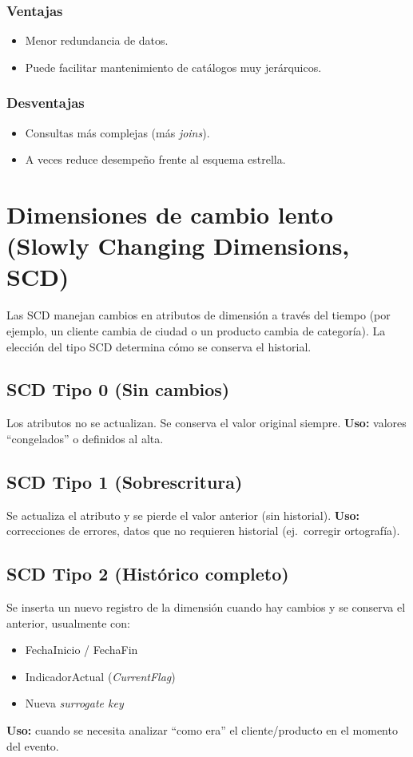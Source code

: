 \documentclass[12pt]{article}
\begin{document}
\subsubsection*{Ventajas}
\begin{itemize}[leftmargin=*, itemsep=0.25em]
  \item Menor redundancia de datos.
  \item Puede facilitar mantenimiento de catálogos muy jerárquicos.
\end{itemize}

\subsubsection*{Desventajas}
\begin{itemize}[leftmargin=*, itemsep=0.25em]
  \item Consultas más complejas (más \textit{joins}).
  \item A veces reduce desempeño frente al esquema estrella.
\end{itemize}

\section{Dimensiones de cambio lento (Slowly Changing Dimensions, SCD)}
Las SCD manejan cambios en atributos de dimensión a través del tiempo (por ejemplo, un cliente cambia de ciudad o un producto cambia de categoría). La elección del tipo SCD determina cómo se conserva el historial.

\subsection*{SCD Tipo 0 (Sin cambios)}
Los atributos no se actualizan. Se conserva el valor original siempre. \textbf{Uso:} valores ``congelados'' o definidos al alta.

\subsection*{SCD Tipo 1 (Sobrescritura)}
Se actualiza el atributo y se pierde el valor anterior (sin historial). \textbf{Uso:} correcciones de errores, datos que no requieren historial (ej.\ corregir ortografía).

\subsection*{SCD Tipo 2 (Histórico completo)}
Se inserta un nuevo registro de la dimensión cuando hay cambios y se conserva el anterior, usualmente con:
\begin{itemize}[leftmargin=*, itemsep=0.25em]
  \item FechaInicio / FechaFin
  \item IndicadorActual (\textit{CurrentFlag})
  \item Nueva \textit{surrogate key}
\end{itemize}
\noindent\textbf{Uso:} cuando se necesita analizar ``como era'' el cliente/producto en el momento del evento.
\end{document}
